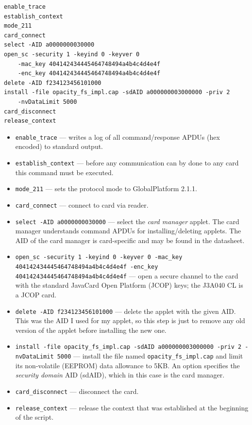 \documentclass[12pt,a4paper,twoside,openright]{report}
\begin{document}
\begin{lstlisting}[caption={Applet install script},captionpos=b,label={gpinstall}]
enable_trace
establish_context
mode_211
card_connect
select -AID a0000000030000
open_sc -security 1 -keyind 0 -keyver 0
    -mac_key 404142434445464748494a4b4c4d4e4f
    -enc_key 404142434445464748494a4b4c4d4e4f
delete -AID f234123456101000
install -file opacity_fs_impl.cap -sdAID a000000003000000 -priv 2
    -nvDataLimit 5000
card_disconnect
release_context
\end{lstlisting}

\begin{itemize}
\item \texttt{enable\_trace} --- writes a log of all command/response APDUs (hex encoded) to standard output.
\item \texttt{establish\_context} --- before any communication can by done to any card this command must be executed.
\item \texttt{mode\_211} --- sets the protocol mode to GlobalPlatform 2.1.1.
\item \texttt{card\_connect} --- connect to card via reader.
\item \texttt{select -AID a0000000030000} --- select the \emph{card manager} applet. The card manager understands command APDUs for installing/deleting applets. The AID of the card manager is card-specific and may be found in the datasheet.
\item \texttt{open\_sc -security 1 -keyind 0 -keyver 0 -mac\_key 404142434445464748494a4b4c4d4e4f -enc\_key 404142434445464748494a4b4c4d4e4f} --- open a secure channel to the card with the standard JavaCard Open Platform (JCOP) keys; the J3A040 CL is a JCOP card.
\item \texttt{delete -AID f234123456101000} --- delete the applet with the given AID. This was the AID I used for my applet, so this step is just to remove any old version of the applet before installing the new one.
\item \texttt{install -file opacity\_fs\_impl.cap -sdAID a000000003000000 -priv 2 -nvDataLimit 5000} --- install the file named \texttt{opacity\_fs\_impl.cap} and limit its non-volatile (EEPROM) data allowance to 5KB. An option specifies the \emph{security domain} AID (sdAID), which in this case is the card manager.
\item \texttt{card\_disconnect} --- disconnect the card.
\item \texttt{release\_context} --- release the context that was established at the beginning of the script.
\end{itemize}
\end{document}
